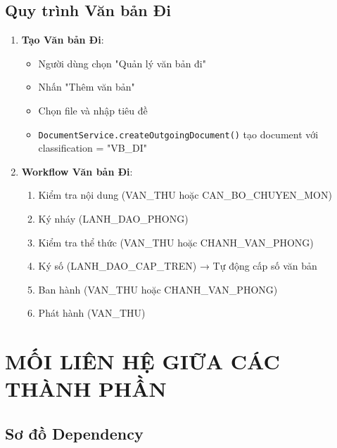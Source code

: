 \documentclass[12pt,a4paper]{article}
\begin{document}
\subsection{Quy trình Văn bản Đi}

\begin{enumerate}
    \item \textbf{Tạo Văn bản Đi}:
    \begin{itemize}
        \item Người dùng chọn "Quản lý văn bản đi"
        \item Nhấn "Thêm văn bản"
        \item Chọn file và nhập tiêu đề
        \item \texttt{DocumentService.createOutgoingDocument()} tạo document với classification = "VB\_DI"
    \end{itemize}
    
    \item \textbf{Workflow Văn bản Đi}:
    \begin{enumerate}
        \item Kiểm tra nội dung (VAN\_THU hoặc CAN\_BO\_CHUYEN\_MON)
        \item Ký nháy (LANH\_DAO\_PHONG)
        \item Kiểm tra thể thức (VAN\_THU hoặc CHANH\_VAN\_PHONG)
        \item Ký số (LANH\_DAO\_CAP\_TREN) → Tự động cấp số văn bản
        \item Ban hành (VAN\_THU hoặc CHANH\_VAN\_PHONG)
        \item Phát hành (VAN\_THU)
    \end{enumerate}
\end{enumerate}

\section{MỐI LIÊN HỆ GIỮA CÁC THÀNH PHẦN}

\subsection{Sơ đồ Dependency}
\end{document}
